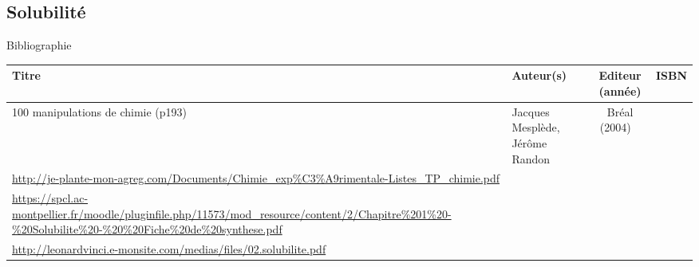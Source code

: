\begin{headerBlock}
\chapter{Solubilité}
\label{LC_Solubilité}
 \end{headerBlock}



\begin{reportBlock}{Bibliographie}

\begin{center}
\begin{tabularx}{\textwidth}{| X | X | c | c |}\hline
Titre & Auteur(s) & Editeur (année) & ISBN \\ \hline
100 manipulations de chimie (p193)~ & Jacques Mesplède, Jérôme Randon ~ & Bréal (2004) ~ & ~ \\
\hline
\url{http://je-plante-mon-agreg.com/Documents/Chimie_exp\%C3\%A9rimentale-Listes_TP_chimie.pdf} &  &  ~ & ~ \\ \hline
 \url{https://spcl.ac-montpellier.fr/moodle/pluginfile.php/11573/mod_resource/content/2/Chapitre\%201\%20-\%20Solubilite\%20-\%20\%20Fiche\%20de\%20synthese.pdf} & ~ &  & ~ \\ 
 \hline
 \url{http://leonardvinci.e-monsite.com/medias/files/02.solubilite.pdf} & ~ &  & ~ \\ 
 \hline
\end{tabularx}
\end{center}

\end{reportBlock}

